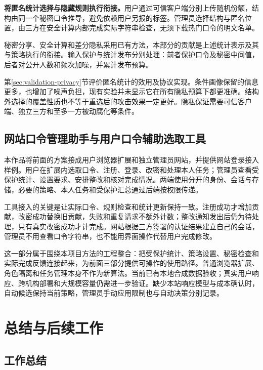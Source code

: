 \documentclass{crypto_report}
\begin{document}
\textbf{将匿名统计选择与隐藏规则执行衔接。}用户通过可信客户端分别上传随机份额，结构由同一个秘密口令推导，避免依赖用户另报的标签。管理员选择结构与匿名位置，由三方在安全计算内部完成实际字符串检查，无须下载热门口令的明文名单。

秘密分享、安全计算和差分隐私采用已有方法，本部分的贡献是上述统计表示及其与策略执行的衔接。输入保护与统计发布分别处理：前者保护口令及秘密中间值，后者对公开人数和频次加噪，并累计发布预算。

第\ref{sec:validation-privacy}节评价匿名统计的效用及协议实现。条件画像保留的信息更多，也增加了噪声负担，现有实验并未显示它在所有隐私预算下都更准确。结构外选择的覆盖性质也不等于重选后的攻击效果一定更好。隐私保证需要可信客户端、独立三方和至多一方被动腐化等条件。

\subsection{网站口令管理助手与用户口令辅助选取工具}\label{sec:innovation-4}

本作品将前面的方案接成用户浏览器扩展和独立管理员网站，并提供网站登录接入样例。用户在扩展内选取口令、注册、登录、改密和处理本人任务；管理员查看受保护统计、设置要求、安排整改和核对完成情况。两端使用分开的身份、会话与存储，必要的策略、本人任务和受保护汇总通过后端按权限传递。

工具接入的关键是让实际口令、规则检查和统计更新保持一致。注册成功才增加贡献，改密成功替换旧贡献，失败和重复请求不额外计数；整改通知发出后仍为待处理，只有真实改密成功才计完成。网站根据三方签署的认证结果建立自己的会话，管理员不用查看口令字符串，也不能用界面操作代替用户完成修改。

这一部分属于围绕本项目方法的工程整合：把受保护统计、策略设置、秘密检查和实际完成反馈连接起来，为前面三部分提供可操作的使用路径。普通浏览器扩展、角色隔离和任务管理本身不作为新算法。当前已有本地合成数据验收；真实用户响应、跨机构部署和大规模容量仍需进一步验证。缺少本站响应模型与成本确认时，自动候选保持当前策略，管理员手动应用限制也与自动决策分别记录。

\clearpage
\section{总结与后续工作}\label{ux7b2cux4e94ux7ae0-ux603bux7ed3ux4e0eux540eux7eedux5de5ux4f5c}

\subsection{工作总结}\label{ux5de5ux4f5cux603bux7ed3}
\end{document}

